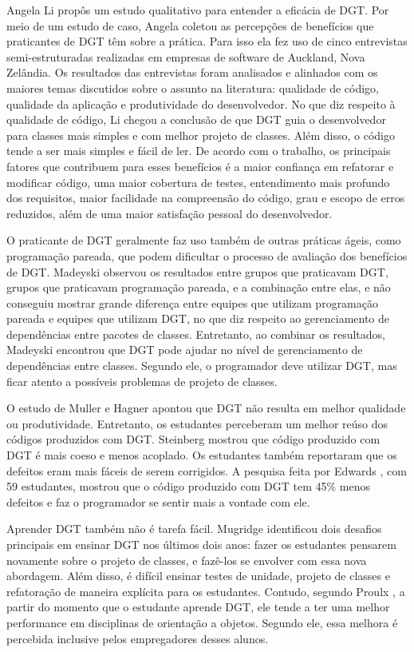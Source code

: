Angela Li \cite{angela-li} propôs um estudo qualitativo para
entender a eficácia de DGT. Por meio de um estudo de caso, Angela coletou as 
percepções de benefícios que praticantes de DGT têm sobre a prática. Para isso ela
fez uso de cinco entrevistas semi-estruturadas realizadas em empresas de software de 
Auckland, Nova Zelândia. Os resultados das entrevistas foram analisados e alinhados
com os maiores temas discutidos sobre o assunto na literatura: qualidade de código,
qualidade da aplicação e produtividade do desenvolvedor.
No que diz respeito à qualidade de código, Li chegou a conclusão de
que DGT guia o desenvolvedor para classes mais simples e com melhor projeto de classes. 
Além disso, o código tende a ser mais simples e fácil de ler.
De acordo com o trabalho, os principais fatores que contribuem para esses benefícios
é a maior confiança em refatorar e modificar código, uma maior cobertura de testes,
entendimento mais profundo dos requisitos, maior facilidade na compreensão do código,
grau e escopo de erros reduzidos, além de uma maior satisfação pessoal do desenvolvedor.

O praticante de DGT geralmente faz uso também de outras práticas ágeis, como
programação pareada, que podem dificultar o processo de avaliação dos benefícios
de DGT. Madeyski \cite{madeyski-package-dependencies} observou os resultados
entre grupos que praticavam DGT, grupos que praticavam programação pareada, 
e a combinação entre elas,
e não conseguiu mostrar grande diferença entre equipes que utilizam programação 
pareada e equipes que utilizam DGT, no que diz respeito ao gerenciamento de dependências entre 
pacotes de classes. Entretanto, ao combinar os resultados, Madeyski encontrou que DGT pode 
ajudar no nível de gerenciamento de dependências entre classes. Segundo ele, o 
programador deve utilizar DGT, mas ficar atento a possíveis problemas de projeto de classes.

O estudo de Muller e Hagner \cite{muller-e-hagner} apontou que DGT não resulta
em melhor qualidade ou produtividade. Entretanto, os estudantes perceberam um 
melhor reúso dos códigos produzidos com DGT. Steinberg \cite{steinberg} mostrou
que código produzido com DGT é mais coeso e menos acoplado. Os estudantes também
reportaram que os defeitos eram mais fáceis de serem corrigidos. A pesquisa feita
por Edwards \cite{edwards}, com 59 estudantes, mostrou que o código produzido com
DGT tem 45\% menos defeitos e faz o programador se sentir mais a vontade
com ele.

Aprender DGT também não é tarefa fácil. Mugridge \cite{mugridge} identificou
dois desafios principais em ensinar DGT nos últimos dois anos: fazer os estudantes
pensarem novamente sobre o projeto de classes, e fazê-los se envolver com essa nova
abordagem. Além disso, é difícil ensinar testes de unidade, projeto de classes e refatoração
de maneira explícita para os estudantes. Contudo, segundo Proulx \cite{proulx}, a partir do momento que
o estudante aprende DGT, ele tende a ter uma melhor performance em disciplinas
de orientação a objetos. Segundo ele, essa melhora é percebida inclusive pelos
empregadores desses alunos. 

